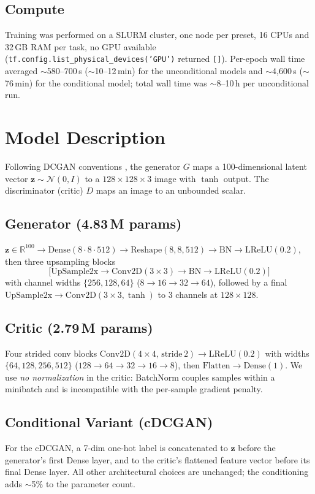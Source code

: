\documentclass[11pt]{article}
\begin{document}
\subsection{Compute}
Training was performed on a SLURM cluster, one node per preset, 16 CPUs and
32\,GB RAM per task, no GPU available
(\texttt{tf.config.list\_physical\_devices('GPU')} returned \texttt{[]}).
Per-epoch wall time averaged $\sim$580--700\,s ($\sim$10--12\,min) for the
unconditional models and $\sim$4{,}600\,s ($\sim$76\,min) for the conditional
model; total wall time was $\sim$8--10\,h per unconditional run.

\section{Model Description}
Following DCGAN conventions \cite{radford2016dcgan}, the generator $G$ maps a
100-dimensional latent vector $\mathbf{z} \sim \mathcal{N}(0,I)$ to a
$128{\times}128{\times}3$ image with $\tanh$ output. The discriminator
(critic) $D$ maps an image to an unbounded scalar.

\subsection{Generator (4.83\,M params)}
$\mathbf{z} \in \mathbb{R}^{100} \to \mathrm{Dense}(8{\cdot}8{\cdot}512) \to
\mathrm{Reshape}(8,8,512) \to \mathrm{BN} \to \mathrm{LReLU}(0.2)$, then three
upsampling blocks
$$\big[\mathrm{UpSample2x} \to \mathrm{Conv2D}(3{\times}3) \to \mathrm{BN}
       \to \mathrm{LReLU}(0.2)\big]$$
with channel widths $\{256, 128, 64\}$ ($8{\to}16{\to}32{\to}64$), followed by
a final $\mathrm{UpSample2x} \to \mathrm{Conv2D}(3{\times}3, \tanh)$ to
$3$ channels at $128{\times}128$.

\subsection{Critic (2.79\,M params)}
Four strided conv blocks $\mathrm{Conv2D}(4{\times}4,\,\text{stride}\,2)
\to \mathrm{LReLU}(0.2)$ with widths $\{64, 128, 256, 512\}$
($128{\to}64{\to}32{\to}16{\to}8$), then $\mathrm{Flatten} \to
\mathrm{Dense}(1)$. We use \emph{no normalization} in the critic: BatchNorm
couples samples within a minibatch and is incompatible with the per-sample
gradient penalty.

\subsection{Conditional Variant (cDCGAN)}
For the cDCGAN, a 7-dim one-hot label is concatenated to $\mathbf{z}$ before
the generator's first Dense layer, and to the critic's flattened feature
vector before its final Dense layer. All other architectural choices are
unchanged; the conditioning adds $\sim$5\% to the parameter count.
\end{document}
